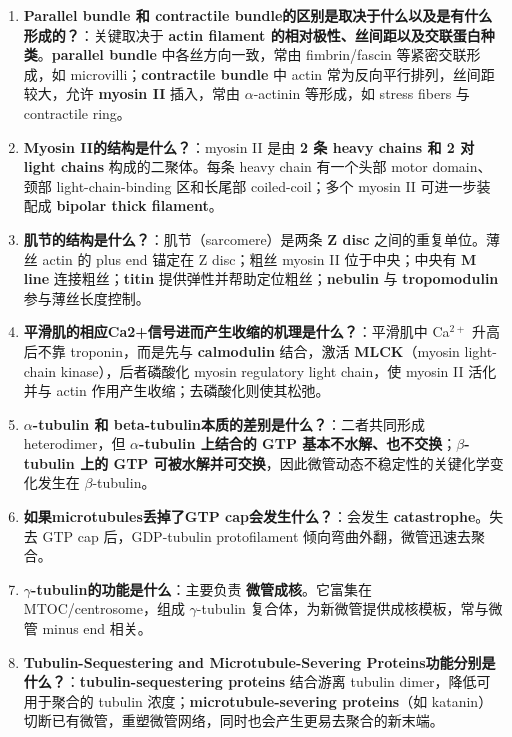 \documentclass[12pt,fontset=none]{ctexart}
\begin{document}
\begin{enumerate}
\item \textbf{Parallel bundle 和 contractile bundle的区别是取决于什么以及是有什么形成的？}：关键取决于 \textbf{actin filament 的相对极性、丝间距以及交联蛋白种类}。\textbf{parallel bundle} 中各丝方向一致，常由 fimbrin/fascin 等紧密交联形成，如 microvilli；\textbf{contractile bundle} 中 actin 常为反向平行排列，丝间距较大，允许 \textbf{myosin II} 插入，常由 $\alpha$-actinin 等形成，如 stress fibers 与 contractile ring。

\item \textbf{Myosin II的结构是什么？}：myosin II 是由 \textbf{2 条 heavy chains 和 2 对 light chains} 构成的二聚体。每条 heavy chain 有一个头部 motor domain、颈部 light-chain-binding 区和长尾部 coiled-coil；多个 myosin II 可进一步装配成 \textbf{bipolar thick filament}。

\item \textbf{肌节的结构是什么？}：肌节（sarcomere）是两条 \textbf{Z disc} 之间的重复单位。薄丝 actin 的 plus end 锚定在 Z disc；粗丝 myosin II 位于中央；中央有 \textbf{M line} 连接粗丝；\textbf{titin} 提供弹性并帮助定位粗丝；\textbf{nebulin} 与 \textbf{tropomodulin} 参与薄丝长度控制。

\item \textbf{平滑肌的相应Ca2+信号进而产生收缩的机理是什么？}：平滑肌中 Ca$^{2+}$ 升高后不靠 troponin，而是先与 \textbf{calmodulin} 结合，激活 \textbf{MLCK}（myosin light-chain kinase），后者磷酸化 myosin regulatory light chain，使 myosin II 活化并与 actin 作用产生收缩；去磷酸化则使其松弛。

\item \textbf{$\alpha$-tubulin 和 beta-tubulin本质的差别是什么？}：二者共同形成 heterodimer，但 \textbf{$\alpha$-tubulin 上结合的 GTP 基本不水解、也不交换}；\textbf{$\beta$-tubulin 上的 GTP 可被水解并可交换}，因此微管动态不稳定性的关键化学变化发生在 $\beta$-tubulin。

\item \textbf{如果microtubules丢掉了GTP cap会发生什么？}：会发生 \textbf{catastrophe}。失去 GTP cap 后，GDP-tubulin protofilament 倾向弯曲外翻，微管迅速去聚合。

\item \textbf{$\gamma$-tubulin的功能是什么}：主要负责 \textbf{微管成核}。它富集在 MTOC/centrosome，组成 $\gamma$-tubulin 复合体，为新微管提供成核模板，常与微管 minus end 相关。

\item \textbf{Tubulin-Sequestering and Microtubule-Severing Proteins功能分别是什么？}：\textbf{tubulin-sequestering proteins} 结合游离 tubulin dimer，降低可用于聚合的 tubulin 浓度；\textbf{microtubule-severing proteins}（如 katanin）切断已有微管，重塑微管网络，同时也会产生更易去聚合的新末端。


\end{enumerate}
\end{document}
